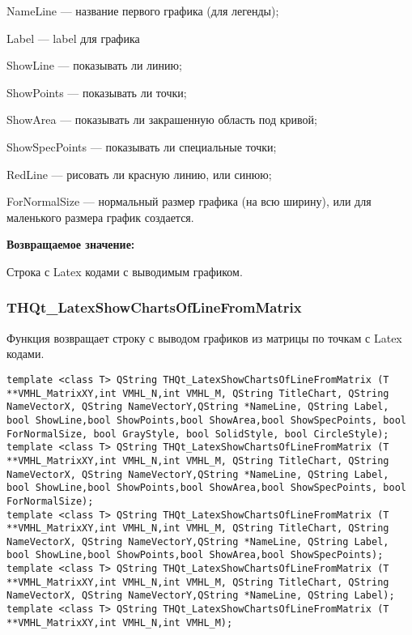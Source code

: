 \documentclass[a4paper,12pt]{article}
\begin{document}
    NameLine --- название первого графика (для легенды);
 
    Label --- label для графика
 
    ShowLine --- показывать ли линию;
 
    ShowPoints --- показывать ли точки;
 
    ShowArea --- показывать ли закрашенную область под кривой;
 
    ShowSpecPoints --- показывать ли специальные точки;
 
    RedLine --- рисовать ли красную линию, или синюю;
 
    ForNormalSize --- нормальный размер графика (на всю ширину), или для маленького размера график создается.
	
\textbf{Возвращаемое значение:}

Строка с Latex кодами с выводимым графиком.


\subsubsection{THQt\_LatexShowChartsOfLineFromMatrix}\label{THQt_LatexShowChartsOfLineFromMatrix}

Функция возвращает строку с выводом графиков из матрицы по точкам с Latex кодами.


\begin{lstlisting}[label=code_syntax_THQt_LatexShowChartsOfLineFromMatrix,caption=Синтаксис]
template <class T> QString THQt_LatexShowChartsOfLineFromMatrix (T **VMHL_MatrixXY,int VMHL_N,int VMHL_M, QString TitleChart, QString NameVectorX, QString NameVectorY,QString *NameLine, QString Label, bool ShowLine,bool ShowPoints,bool ShowArea,bool ShowSpecPoints, bool ForNormalSize, bool GrayStyle, bool SolidStyle, bool CircleStyle);
template <class T> QString THQt_LatexShowChartsOfLineFromMatrix (T **VMHL_MatrixXY,int VMHL_N,int VMHL_M, QString TitleChart, QString NameVectorX, QString NameVectorY,QString *NameLine, QString Label, bool ShowLine,bool ShowPoints,bool ShowArea,bool ShowSpecPoints, bool ForNormalSize);
template <class T> QString THQt_LatexShowChartsOfLineFromMatrix (T **VMHL_MatrixXY,int VMHL_N,int VMHL_M, QString TitleChart, QString NameVectorX, QString NameVectorY,QString *NameLine, QString Label, bool ShowLine,bool ShowPoints,bool ShowArea,bool ShowSpecPoints);
template <class T> QString THQt_LatexShowChartsOfLineFromMatrix (T **VMHL_MatrixXY,int VMHL_N,int VMHL_M, QString TitleChart, QString NameVectorX, QString NameVectorY,QString *NameLine, QString Label);
template <class T> QString THQt_LatexShowChartsOfLineFromMatrix (T **VMHL_MatrixXY,int VMHL_N,int VMHL_M);
\end{lstlisting}
\end{document}
